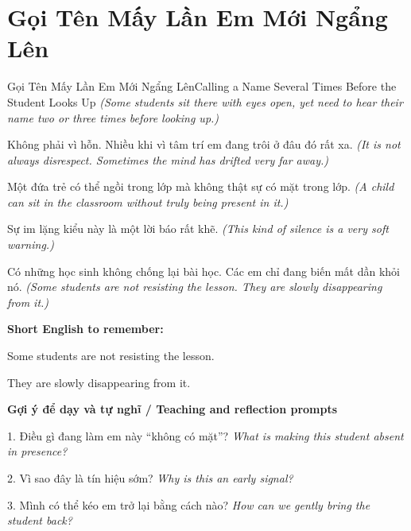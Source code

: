 \section{Gọi Tên Mấy Lần Em Mới Ngẩng Lên}
\begin{truyen}{Gọi Tên Mấy Lần Em Mới Ngẩng Lên}{Calling a Name Several Times Before the Student Looks Up}
\textit{(Some students sit there with eyes open, yet need to hear their name two or three times before looking up.)}

Không phải vì hỗn. Nhiều khi vì tâm trí em đang trôi ở đâu đó rất xa.
\textit{(It is not always disrespect. Sometimes the mind has drifted very far away.)}

Một đứa trẻ có thể ngồi trong lớp mà không thật sự có mặt trong lớp.
\textit{(A child can sit in the classroom without truly being present in it.)}

Sự im lặng kiểu này là một lời báo rất khẽ.
\textit{(This kind of silence is a very soft warning.)}

\end{truyen}

\begin{baihoc}
Có những học sinh không chống lại bài học. Các em chỉ đang biến mất dần khỏi nó.
\textit{(Some students are not resisting the lesson. They are slowly disappearing from it.)}
\end{baihoc}

\begin{ghinhoanh}
\textbf{Short English to remember:}

Some students are not resisting the lesson.

They are slowly disappearing from it.

\end{ghinhoanh}

\begin{tuhocnhanh}
\textbf{Gợi ý để dạy và tự nghĩ / Teaching and reflection prompts}

1. Điều gì đang làm em này “không có mặt”? \textit{What is making this student absent in presence?}

2. Vì sao đây là tín hiệu sớm? \textit{Why is this an early signal?}

3. Mình có thể kéo em trở lại bằng cách nào? \textit{How can we gently bring the student back?}
\end{tuhocnhanh}
\ngancach


